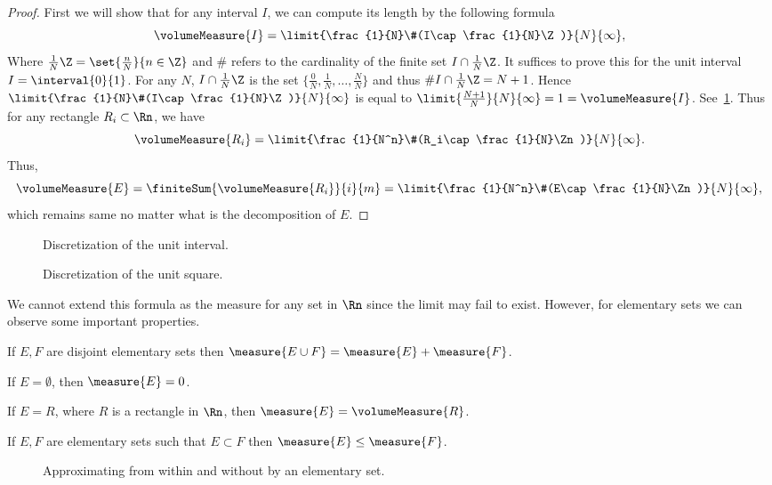\begin{proof}
    First we will show that for any interval $I$, we can compute its length by the following formula
    \[\volumeMeasure{I} = \limit{\frac{1}{N}\#(I\cap \frac{1}{N}\Z)}{N}{\infty},\]
    Where $\frac{1}{N}\Z = \set{\frac{n}{N}}{n\in\Z}$ and $\#$ refers to the cardinality of the finite set
    $I\cap \frac{1}{N}\Z$. It suffices to prove this for the unit interval $I = \interval{0}{1}$. For any $N$,
    $I\cap \frac{1}{N}\Z$ is the set $\lbrace \frac{0}{N},\frac{1}{N},\dots,\frac{N}{N}\rbrace$ and thus 
    $\#I\cap \frac{1}{N}\Z = N+1$. Hence $\limit{\frac{1}{N}\#(I\cap \frac{1}{N}\Z)}{N}{\infty}$ is
    equal to $\limit{\frac{N+1}{N}}{N}{\infty} = 1 = \volumeMeasure{I}$.
    See~\ref{fig:tikz:interval_discretization}. Thus for any rectangle $R_i \subset
    \Rn$, we have
    \[\volumeMeasure{R_i} = \limit{\frac{1}{N^n}\#(R_i\cap \frac{1}{N}\Zn)}{N}{\infty}.\] 
    Thus,
    \[\volumeMeasure{E} = \finiteSum{\volumeMeasure{R_i}}{i}{m} = 
	\limit{\frac{1}{N^n}\#(E\cap \frac{1}{N}\Zn)}{N}{\infty},\]
    which remains same no matter what is the decomposition of $E$. 
\end{proof}
\begin{figure}
    
    \caption{Discretization of the unit interval.}\label{fig:tikz:interval_discretization}
\end{figure}
\begin{figure}
    
    \caption{Discretization of the unit square.}\label{fig:tikz:interval_discretization2}
\end{figure}
We cannot extend this formula as the measure for any set in $\Rn$ since the limit may fail to exist. However,
for elementary sets we can observe some important properties.
\begin{properties}
\item
    If $E,F$ are disjoint elementary sets then $\measure{E\cup F} = \measure{E} + \measure{F}$.
\item
    If $E = \emptyset$, then $\measure{E} = 0$.
\item
    If $E = R$, where $R$ is a rectangle in $\Rn$, then $\measure{E} = \volumeMeasure{R}$.
\item
    If $E,F$ are elementary sets such that $E \subset F$ then $\measure{E} \leq \measure{F}$.
\end{properties}
\begin{figure}
    
    \caption{Approximating from within and without by an elementary set.}\label{fig:tikz:in_out_approx}
\end{figure}
